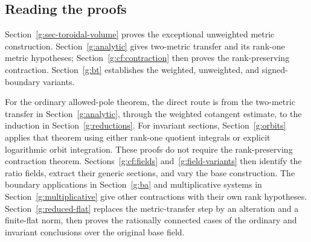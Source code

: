 \subsection{Reading the proofs}

Section~\ref{g:sec-toroidal-volume} proves the exceptional unweighted
metric construction. Section~\ref{g:analytic} gives two-metric transfer
and its rank-one metric hypotheses; Section~\ref{g:cf:contraction} then
proves the rank-preserving contraction. Section~\ref{g:bt} establishes
the weighted, unweighted, and signed-boundary variants.

For the ordinary allowed-pole theorem, the direct route is from the
two-metric transfer in Section~\ref{g:analytic}, through the weighted
cotangent estimate, to the induction in Section~\ref{g:reductions}.
For invariant sections, Section~\ref{g:orbits} applies that theorem
using either rank-one quotient integrals or explicit logarithmic orbit
integration. These proofs do not require the rank-preserving
contraction theorem. Sections~\ref{g:cf:fields}
and~\ref{g:field-variants} then identify the ratio fields, extract their
generic sections, and vary the base construction. The boundary
applications in Section~\ref{g:ba} and multiplicative systems in
Section~\ref{g:multiplicative} give other contractions with their own
rank hypotheses.
Section~\ref{g:reduced-flat} replaces the metric-transfer step by an
alteration and a finite-flat norm, then proves the rationally connected
cases of the ordinary and invariant conclusions over the original base
field.
